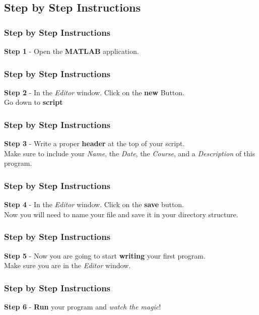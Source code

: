 \documentclass{ltx-talk} %
\newcommand{\sectionIIIsubsectionIIItitle}{Step by Step Instructions}
\begin{document}
		\subsection{\sectionIIIsubsectionIIItitle}\label{sectionIIIsubsectionIII}

			\begin{frame}
				\frametitle{\sectionIIIsubsectionIIItitle}

				\textbf{Step 1} - Open the {\bf MATLAB} application.
				
				\btVFill
			\end{frame}

			\begin{frame}
				\frametitle{\sectionIIIsubsectionIIItitle}
%
				\textbf{Step 2} - In the {\it Editor} window. Click on the {\bf new } Button. \vspace{3mm}\\ \hspace*{12mm}Go down to {\bf script}
				
				\btVFill
			\end{frame}

			\begin{frame}
				\frametitle{\sectionIIIsubsectionIIItitle}

				\textbf{Step 3} - Write a proper {\bf header} at the top of your script. \vspace{3mm}\\ Make sure to include your {\it Name}, the {\it Date}, the {\it Course}, and a {\it Description} of this program.
				
				\btVFill
			\end{frame}

			\begin{frame}
				\frametitle{\sectionIIIsubsectionIIItitle}

				\textbf{Step 4} - In the {\it Editor} window. Click on the {\bf save} button. \vspace{3mm}\\ Now you will need to name your file and save it in your directory structure.
				
				\btVFill
			\end{frame}

			\begin{frame}
				\frametitle{\sectionIIIsubsectionIIItitle}

				\textbf{Step 5} - Now you are going to start {\bf writing} your first program. \vspace{3mm}\\ Make sure you are in the {\it Editor} window.
				
				\btVFill
			\end{frame}

			\begin{frame}
				\frametitle{\sectionIIIsubsectionIIItitle}

				\textbf{Step 6} - {\bf Run} your program and {\it watch the magic}!
				
				\btVFill
			\end{frame}
\end{document}
